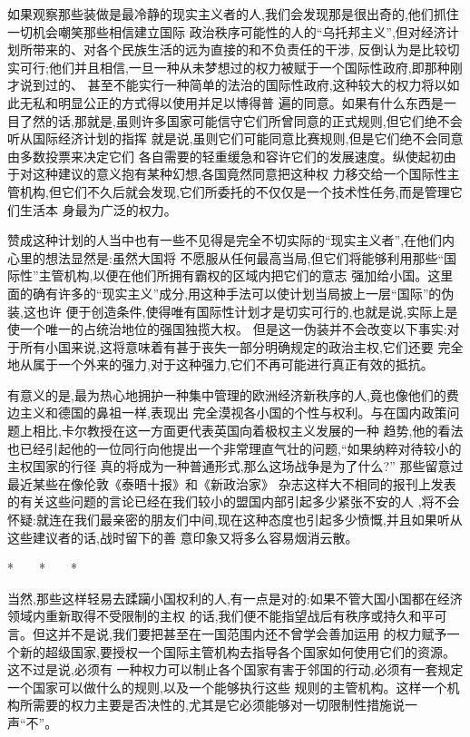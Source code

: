 ﻿\documentclass[12pt]{article}
\begin{document}
如果观察那些装做是最冷静的现实主义者的人,我们会发现那是很出奇的,他们抓住一切机会嘲笑那些相信建立国际
政治秩序可能性的人的``乌托邦主义'',但对经济计划所带来的、对各个民族生活的远为直接的和不负责任的干涉,
反倒认为是比较切实可行;他们并且相信,一旦一种从未梦想过的权力被赋于一个国际性政府,即那种刚才说到过的、
甚至不能实行一种简单的法治的国际性政府,这种较大的权力将以如此无私和明显公正的方式得以使用并足以博得普
遍的同意。如果有什么东西是一目了然的话,那就是,虽则许多国家可能信守它们所曾同意的正式规则,但它们绝不会
听从国际经济计划的指挥 \myrule 就是说,虽则它们可能同意比赛规则,但是它们绝不会同意由多数投票来决定它们
各自需要的轻重缓急和容许它们的发展速度。纵使起初由于对这种建议的意义抱有某种幻想,各国竟然同意把这种权
力移交给一个国际性主管机构,但它们不久后就会发现,它们所委托的不仅仅是一个技术性任务,而是管理它们生活本
身最为广泛的权力。

赞成这种计划的人当中也有一些不见得是完全不切实际的``现实主义者'',在他们内心里的想法显然是:虽然大国将
不愿服从任何最高当局,但它们将能够利用那些``国际性''主管机构,以便在他们所拥有霸权的区域内把它们的意志
强加给小国。这里面的确有许多的``现实主义''成分,用这种手法可以使计划当局披上一层``国际''的伪装,这也许
便于创造条件,使得唯有国际性计划才是切实可行的,也就是说,实际上是使一个唯一的占统治地位的强国独揽大权。
但是这一伪装并不会改变以下事实:对于所有小国来说,这将意味着有甚于丧失一部分明确规定的政治主权,它们还要
完全地从属于一个外来的强力,对于这种强力,它们不再可能进行真正有效的抵抗。

有意义的是,最为热心地拥护一种集中管理的欧洲经济新秩序的人,竟也像他们的费边主义和德国的鼻祖一样,表现出
完全漠视各小国的个性与权利。与在国内政策问题上相比,卡尔教授在这一方面更代表英国向着极权主义发展的一种
趋势,他的看法也已经引起他的一位同行向他提出一个非常理直气壮的问题,``如果纳粹对待较小的主权国家的行径
真的将成为一种普通形式,那么这场战争是为了什么?'' 那些留意过最近某些在像伦敦《泰晤十报》和《新政治家》
杂志这样大不相同的报刊上发表的有关这些问题的言论已经在我们较小的盟国内部引起多少紧张不安的人 ,将不会
怀疑:就连在我们最亲密的朋友们中间,现在这种态度也引起多少愤慨,并且如果听从这些建议者的话,战时留下的善
意印象又将多么容易烟消云散。

*　　*　　*

当然,那些这样轻易去蹂躏小国权利的人,有一点是对的:如果不管大国小国都在经济领域内重新取得不受限制的主权
的话,我们便不能指望战后有秩序或持久和平可言。但这并不是说,我们要把甚至在一国范围内还不曾学会善加运用
的权力赋予一个新的超级国家,要授权一个国际主管机构去指导各个国家如何使用它们的资源。这不过是说,必须有
一种权力可以制止各个国家有害于邻国的行动,必须有一套规定一个国家可以做什么的规则,以及一个能够执行这些
规则的主管机构。这样一个机构所需要的权力主要是否决性的,尤其是它必须能够对一切限制性措施说一声``不''。
\end{document}
